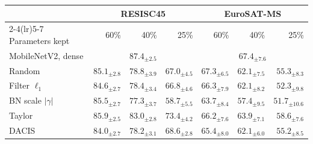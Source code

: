 \begin{tabular}{@{}lrrrrrr@{}}
\toprule
 & \multicolumn{3}{c}{RESISC45} & \multicolumn{3}{c}{EuroSAT-MS} \\
\cmidrule(lr){2-4}\cmidrule(lr){5-7}
Parameters kept & 60\% & 40\% & 25\% & 60\% & 40\% & 25\% \\
\midrule
MobileNetV2, dense & \multicolumn{3}{c}{$87.4_{\pm2.5}$} & \multicolumn{3}{c}{$67.4_{\pm7.6}$} \\
\midrule
Random & $85.1_{\pm2.8}$ & $78.8_{\pm3.9}$ & $67.0_{\pm4.5}$ & $67.3_{\pm6.5}$ & $62.1_{\pm7.5}$ & $55.3_{\pm8.3}$ \\
Filter $\ell_1$ & $84.6_{\pm2.7}$ & $78.4_{\pm3.4}$ & $66.8_{\pm4.6}$ & $66.3_{\pm7.9}$ & $62.1_{\pm8.2}$ & $52.3_{\pm9.8}$ \\
BN scale $|\gamma|$ & $85.5_{\pm2.7}$ & $77.3_{\pm3.7}$ & $58.7_{\pm5.5}$ & $63.7_{\pm8.4}$ & $57.4_{\pm9.5}$ & $51.7_{\pm10.6}$ \\
Taylor & $85.9_{\pm2.5}$ & $83.0_{\pm2.8}$ & $73.4_{\pm4.2}$ & $66.2_{\pm7.6}$ & $63.9_{\pm7.1}$ & $58.6_{\pm7.6}$ \\
DACIS & $84.0_{\pm2.7}$ & $78.2_{\pm3.1}$ & $68.6_{\pm2.8}$ & $65.4_{\pm8.0}$ & $62.1_{\pm6.0}$ & $55.2_{\pm8.5}$ \\
\bottomrule
\end{tabular}